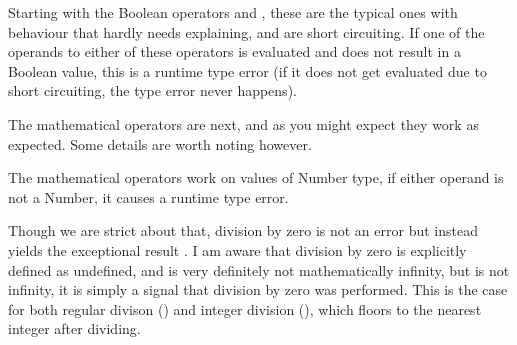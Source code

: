 Starting with the Boolean operators \op{\&\&} and \op{||}, these are the typical
ones with behaviour that hardly needs explaining, and are short circuiting. If
one of the operands to either of these operators is evaluated and does not result
in a Boolean value, this is a runtime type error (if it does not get evaluated
due to short circuiting, the type error never happens).

\begin{prooftree}
\end{prooftree}

\begin{prooftree}
\end{prooftree}

\begin{prooftree}
\end{prooftree}

\begin{prooftree}
\end{prooftree}

\begin{prooftree}
\end{prooftree}

\begin{prooftree}
\end{prooftree}

The mathematical operators are next, and as you might expect they work
as expected. Some details are worth noting however.

The mathematical operators work on values of Number type, if either operand
is not a Number, it causes a runtime type error.

Though we are strict about that, division by zero is not an error but instead
yields the exceptional result . I am aware that division by zero is
explicitly defined as undefined, and is very definitely not mathematically
infinity, but  is not infinity, it is simply a signal that division
by zero was performed. This is the case for both regular divison (\op{/}) and
integer division (\op{//}), which floors to the nearest integer after dividing.

